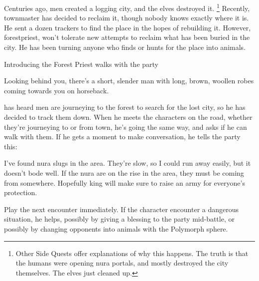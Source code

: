 \begin{multicols}{2}

\resumecontents[Town]
\resumecontents[Forest]

\label{herenofarther}

\stopcontents[Town]
\stopcontents[Forest]

\startcontents[sq]

\sqminitoc

Centuries ago, men created a logging city, and the elves destroyed it.
\footnote{Other Side Quests offer explanations of why this happens.
The truth is that the humans were opening nura portals, and mostly destroyed the city themselves.
The elves just cleaned up.} 
Recently, \gls{townmaster} has decided to reclaim it, though nobody knows exactly where it is.
He sent a dozen trackers to find the place in the hopes of rebuilding it.
However, \gls{forestpriest}, won't tolerate new attempts to reclaim what has been buried in the city.
He has been turning anyone who finds or hunts for the place into animals.

{Introducing the Forest Priest}%
{ walks with the party}%

\begin{boxtext}

	Looking behind you, there's a short, slender man with long, brown, woollen robes coming towards you on horseback.

\end{boxtext}

 has heard men are journeying to the forest to search for the lost city, so he has decided to track them down.
When he meets the characters on the road, whether they're journeying to or from town, he's going the same way, and asks if he can walk with them.
If he gets a moment to make conversation, he tells the party this:

\begin{speechtext}

	I've found nura slugs in the area.
	They're slow, so I could run away easily, but it doesn't bode well.
	If the nura are on the rise in the area, they must be coming from somewhere.
	Hopefully \gls{king} will make sure to raise an army for everyone's protection.

\end{speechtext}

Play the next encounter immediately.
If the character encounter a dangerous situation, he helps, possibly by giving a blessing to the party mid-battle, or possibly by changing opponents into animals with the Polymorph sphere.


\end{multicols}
